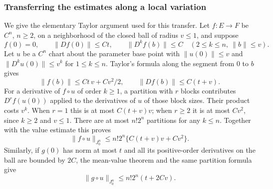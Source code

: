 \subsubsection{Transferring the estimates along a local variation}
We give the elementary Taylor argument used for this transfer.
Let $f:E\to F$ be $C^n$, $n\ge2$, on a neighborhood of the
closed ball of radius $v\le1$, and suppose
\[
 f(0)=0,\qquad \|Df(0)\|\le Ct,
 \qquad \|D^kf(b)\|\le C\quad(2\le k\le n,\ \|b\|\le v).
\]
Let $u$ be a $C^n$ chart about the parameter base point with
$\|u(0)\|\le v$ and $\|D^ku(0)\|\le v^k$ for $1\le k\le n$.
Taylor's formula along the segment from $0$ to $b$ gives
\[
 \|f(b)\|\le Ct\,v+Cv^2/2,
                       \qquad \|Df(b)\|\le C(t+v).
\]
For a derivative of $f\circ u$ of order $k\ge1$, a partition
with $r$ blocks contributes $D^rf(u(0))$ applied to the
derivatives of $u$ of those block sizes. Their product costs
$v^k$. When $r=1$ this is at most $C(t+v)v$; when $r\ge2$
it is at most $Cv^2$, since $k\ge2$ and $v\le1$.
There are at most $n!2^n$ partitions for any $k\le n$.
Together with the value estimate this proves
\begin{equation}\label{eq:comparison-quadratic-jet-gain}
 \|f\circ u\|_{J^n_0}
                  \le n!2^n\{C(t+v)v+Cv^2\}.
\end{equation}
Similarly, if $g(0)$ has norm at most $t$ and all its
positive-order derivatives on the ball are bounded by $2C$,
the mean-value theorem and the same partition formula give
\begin{equation}\label{eq:comparison-linear-jet-gain}
                \|g\circ u\|_{J^n_0}\le n!2^n(t+2Cv).
\end{equation}

